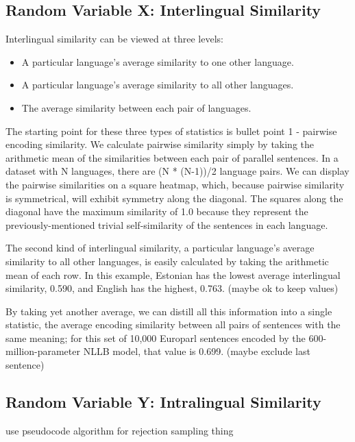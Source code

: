 \subsection{Random Variable X: Interlingual Similarity}

Interlingual similarity can be viewed at three levels: 

\begin{itemize}
	\item A particular language’s average similarity to one other language. 
	\item A particular language’s average similarity to all other languages.
	\item The average similarity between each pair of languages.
\end{itemize}

The starting point for these three types of statistics is bullet point 1 - pairwise encoding similarity. We calculate pairwise similarity simply by taking the arithmetic mean of the similarities between each pair of parallel sentences. In a dataset with N languages, there are (N * (N-1))/2 language pairs. We can display the pairwise similarities on a square heatmap, which, because pairwise similarity is symmetrical, will exhibit symmetry along the diagonal. The squares along the diagonal have the maximum similarity of 1.0 because they represent the previously-mentioned trivial self-similarity of the sentences in each language.  

The second kind of interlingual similarity, a particular language’s average similarity to all other languages, is easily calculated by taking the arithmetic mean of each row. In this example, Estonian has the lowest average interlingual similarity, 0.590, and English has the highest, 0.763. (maybe ok to keep values)

By taking yet another average, we can distill all this information into a single statistic, the average encoding similarity between all pairs of sentences with the same meaning; for this set of 10,000 Europarl sentences encoded by the 600-million-parameter NLLB model, that value is 0.699. (maybe exclude last sentence)

\subsection{Random Variable Y: Intralingual Similarity}

use pseudocode algorithm for rejection sampling thing

